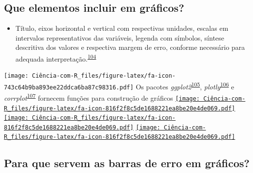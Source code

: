 \documentclass[
]{book}
\providecommand{\tightlist}{%
  \setlength{\itemsep}{0pt}\setlength{\parskip}{0pt}}
\begin{document}
\hypertarget{que-elementos-incluir-em-gruxe1ficos}{%
\subsection{Que elementos incluir em gráficos?}\label{que-elementos-incluir-em-gruxe1ficos}}

\begin{itemize}
\tightlist
\item
  Título, eixos horizontal e vertical com respectivas unidades, escalas em intervalos representativos das variáveis, legenda com símbolos, síntese descritiva dos valores e respectiva margem de erro, conforme necessário para adequada interpretação.\textsuperscript{\protect\hyperlink{ref-Park2022}{104}}
\end{itemize}

\texttt{[image: Ciência-com-R\_files/figure-latex/fa-icon-743c64b9ba893ee22ddca6ba87c98316.pdf]} Os pacotes \emph{ggplot2}\textsuperscript{\protect\hyperlink{ref-ggplot2}{105}}, \emph{plotly}\textsuperscript{\protect\hyperlink{ref-plotly}{106}} e \emph{corrplot}\textsuperscript{\protect\hyperlink{ref-corrplot}{107}} fornecem funções para construção de gráficos \href{https://cran.r-project.org/web/packages/ggplot2/index.html}{\texttt{[image: Ciência-com-R\_files/figure-latex/fa-icon-816f2f8c5de1688221ea8be20e4de069.pdf]}} \href{https://cran.r-project.org/web/packages/plotly/index.html}{\texttt{[image: Ciência-com-R\_files/figure-latex/fa-icon-816f2f8c5de1688221ea8be20e4de069.pdf]}} \href{https://cran.r-project.org/web/packages/corrplot/index.html}{\texttt{[image: Ciência-com-R\_files/figure-latex/fa-icon-816f2f8c5de1688221ea8be20e4de069.pdf]}}

\hypertarget{para-que-servem-as-barras-de-erro-em-gruxe1ficos}{%
\subsection{Para que servem as barras de erro em gráficos?}\label{para-que-servem-as-barras-de-erro-em-gruxe1ficos}}
\end{document}
